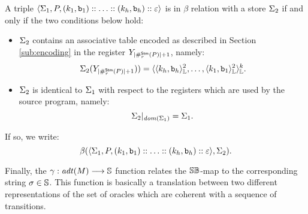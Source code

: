 
\begin{defn}
  \label{def:beta}
  A triple $\langle \Sigma_1, P, (k_1, \mathtt{b}_1)::\ldots ::(k_h, \mathtt{b}_h)::\varepsilon\rangle$
  is in $\beta$ relation with a store $\Sigma_2$ if and only if the two conditions below hold:

  \begin{itemize}
    \item $\Sigma_2$ contains an associative table encoded as described in Section
    \ref{sub:encoding} in the register ${Y_{{|\#_r^{\mathsf{Stm}}(P)|+1}}}$, namely:
    $$
    \Sigma_2({Y_{{|\#_r^{\mathsf{Stm}}(P)|+1}})}) = {\langle{\langle{k_h, \mathtt{b}_h}\rangle^{2}_{\mathbb{L}}, \ldots, \langle{k_1, \mathtt{b}_1}\rangle^{2}_{\mathbb{L}}}\rangle^{k}_{\mathbb{L}}}.
    $$
    \item $\Sigma_2$ is identical to $\Sigma_1$ with respect to the registers
    which are used by the source program, namely:
    $$
    \Sigma_2|_{\mathit{dom}(\Sigma_1)} = \Sigma_1.
    $$
  \end{itemize}

  If so, we write:
  $$
  \beta(\langle \Sigma_1, P, (k_1, \mathtt{b}_1)::\ldots ::(k_h, \mathtt{b}_h)::\varepsilon\rangle, \Sigma_2).
  $$
\end{defn}

Finally, the $\gamma: \mathit{adt}(M)\longrightarrow \mathbb{S}$ function
relates the $\mathbb{S}\mathbb{B}$-map to the corresponding
string $\sigma \in \mathbb{S}$. This function is basically a translation between two
different representations of the set of oracles which are coherent with a
sequence of transitions.

